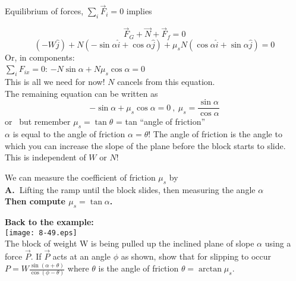 \documentclass{seminar}
\begin{document}
\begin{slide}
Equilibrium of forces, $\sum_i \vec F_i = 0$ implies

$$
\vec F_G + \vec N + \vec F_f=0
$$
$$
\left(-W\hat j\right) + N\left( -\sin\alpha \hat i +
\cos\alpha\hat j\right)+ \mu_s N \left( \cos\alpha \hat i
+ \sin\alpha\hat j\right) =0
$$
Or, in components:\\
$\sum_i F_{ix}=0$: $-N\sin\alpha +N\mu_s\cos\alpha=0$\\
This is all we need for now! 
$N$ cancels from this equation.\\
The remaining equation can be written as
$$
-\sin\alpha+\mu_s\cos\alpha=0~,~\mu_s=\frac{\sin\alpha}{\cos\alpha}
$$
or 
~but remember $\mu_s=\tan\theta$ = tan ``angle of friction''\\
$\alpha$ is equal to the angle of friction $\alpha=\theta$!
The angle of friction is the angle to which you can increase
the slope of the plane before the block starts to slide.
This is independent of $W$ or $N$!
\vfill
\end{slide}










\begin{slide}

We can measure the coefficient of friction $\mu_s$ by \\
{\bf A.~}Lifting the ramp until the block slides, then measuring the
 angle $\alpha$\\

{\bf\magenta Then compute $\mu_s=\tan\alpha$.}

\vfill
\end{slide}











\begin{slide}
{\bf\blue Back to the example:}\\
\texttt{[image: 8-49.eps]}\\ 
The block of weight W is being pulled up the inclined plane of slope
$\alpha$ using a force $\vec P$.  If $\vec P$ acts at an angle $\phi$
as shown, show that for slipping to occur
$P=W\frac{\sin(\alpha+\theta)}{\cos(\phi-\theta)}$ where $\theta$ is
the angle of friction $\theta=\arctan\mu_s$.  \vfill
\end{slide}
\end{document}
